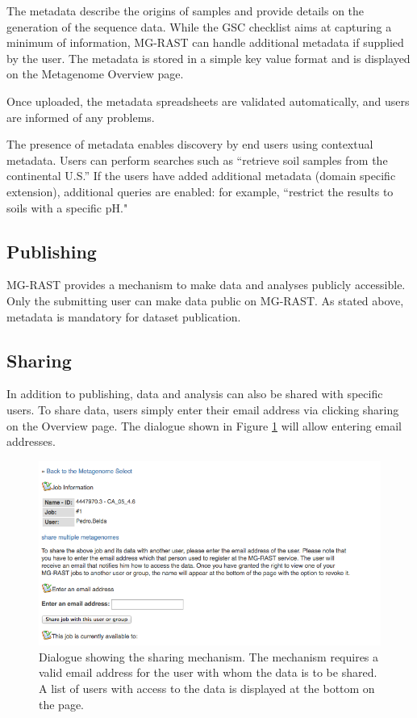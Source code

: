 \documentclass[12pt,fullpage]{report}
\begin{document}
The metadata describe the origins of samples and provide details on the generation of the sequence data. While the GSC checklist aims at capturing a minimum of information, MG-RAST can handle additional metadata if supplied by the user. The metadata is stored in a simple key value format and is displayed on the Metagenome Overview page.

Once uploaded, the metadata spreadsheets are validated automatically, and users are informed of any problems.

The presence of metadata enables discovery by end users using contextual metadata. Users can perform searches such as ``retrieve soil samples from the continental U.S.” If the users have added additional metadata (domain specific extension), additional queries are enabled: for example, ``restrict the results to soils with a specific pH."
\subsection{Publishing}
MG-RAST provides a mechanism to make data and analyses publicly accessible. Only the submitting user can make data public on MG-RAST. As stated above, metadata is mandatory for dataset publication.

\subsection{Sharing}
In addition to publishing, data and analysis can also be shared with specific users. To share data, users simply enter their email address via clicking sharing on the Overview page. The dialogue shown in Figure \ref{fig:sharing} will allow entering email addresses.

\begin{figure}
\begin{center}
\includegraphics[width=6in]{Images/sharing}
\end{center}
\caption{
Dialogue showing the sharing mechanism.
The mechanism requires a valid email address for the user with whom the data is to be shared. A list of users with access to the data is displayed at the bottom on the page.
}
\label{fig:sharing}
\end{figure}
\end{document}
